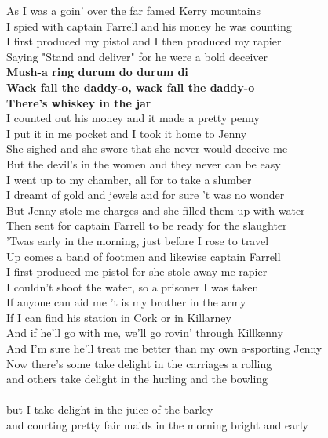 \documentclass[letterpaper,9pt]{article}
\begin{document}
\Large
As I was a goin' over the far famed Kerry mountains \\
I spied with captain Farrell and his money he was counting \\
I first produced my pistol and I then produced my rapier \\
Saying "Stand and deliver" for he were a bold deceiver \\
\textbf{Mush-a ring durum do durum di \\
Wack fall the daddy-o, wack fall the daddy-o \\
There's whiskey in the jar} \\

I counted out his money and it made a pretty penny \\
I put it in me pocket and I took it home to Jenny \\
She sighed and she swore that she never would deceive me \\
But the devil's in the women and they never can be easy \\

I went up to my chamber, all for to take a slumber \\
I dreamt of gold and jewels and for sure 't was no wonder \\
But Jenny stole me charges and she filled them up with water \\
Then sent for captain Farrell to be ready for the slaughter \\

'Twas early in the morning, just before I rose to travel \\
Up comes a band of footmen and likewise captain Farrell \\
I first produced me pistol for she stole away me rapier \\
I couldn't shoot the water, so a prisoner I was taken \\

If anyone can aid me 't is my brother in the army \\
If I can find his station in Cork or in Killarney \\
And if he'll go with me, we'll go rovin' through Killkenny \\
And I'm sure he'll treat me better than my own a-sporting Jenny \\

Now there's some take delight in the carriages a rolling \\
and others take delight in the hurling and the bowling \\ \\
but I take delight in the juice of the barley \\
and courting pretty fair maids in the morning bright and early \\
\end{document}
